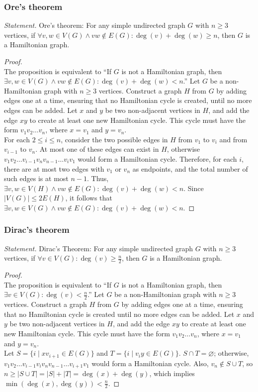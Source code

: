 \documentclass[a4paper,12pt]{report}
\begin{document}
\subsubsection{Ore's theorem}
\textit{Statement. }Ore's theorem: For any simple undirected graph $G$ with $n \geq 3$ vertices, if \(\forall v, w \in V(G) \wedge vw \notin E(G): \deg(v) + \deg(w) \geq n\), then $G$ is a Hamiltonian graph.
\begin{proof}\mbox{}\\
The proposition is equivalent to ``If $G$ is not a Hamiltonian graph, then \(\exists v, w \in V(G) \wedge vw \notin E(G): \deg(v) + \deg(w) < n\).'' Let $G$ be a non-Hamiltonian graph with $n \geq 3$ vertices. Construct a graph $H$ from $G$ by adding edges one at a time, ensuring that no Hamiltonian cycle is created, until no more edges can be added. Let $x$ and $y$ be two non-adjacent vertices in $H$, and add the edge $xy$ to create at least one new Hamiltonian cycle. This cycle must have the form $v_1v_2\ldots v_n$, where $x = v_1$ and $y = v_n$.  \\
For each $2 \leq i \leq n$, consider the two possible edges in $H$ from $v_1$ to $v_i$ and from $v_{i-1}$ to $v_n$. At most one of these edges can exist in $H$, otherwise $v_1v_2\ldots v_{i-1}v_nv_{n-1}\ldots v_iv_1$ would form a Hamiltonian cycle. Therefore, for each $i$, there are at most two edges with $v_1$ or $v_n$ as endpoints, and the total number of such edges is at most $n - 1$. Thus, \(\exists v, w \in V(H) \wedge vw \notin E(G): \deg(v) + \deg(w) < n\). Since $|V(G)| \leq 2E(H)$, it follows that \(\exists v, w \in V(G) \wedge vw \notin E(G): \deg(v) + \deg(w) < n\).
\end{proof}
\subsubsection{Dirac's theorem}
\textit{Statement. }Dirac's Theorem: For any simple undirected graph $G$ with $n \geq 3$ vertices, if $\forall v \in V(G): \deg(v) \geq \frac{n}{2}$, then $G$ is a Hamiltonian graph.
\begin{proof}\mbox{}\\
The proposition is equivalent to ``If $G$ is not a Hamiltonian graph, then $\exists v \in V(G): \deg(v) < \frac{n}{2}$.'' Let $G$ be a non-Hamiltonian graph with $n \geq 3$ vertices. Construct a graph $H$ from $G$ by adding edges one at a time, ensuring that no Hamiltonian cycle is created until no more edges can be added. Let $x$ and $y$ be two non-adjacent vertices in $H$, and add the edge $xy$ to create at least one new Hamiltonian cycle. This cycle must have the form $v_1v_2\ldots v_n$, where $x = v_1$ and $y = v_n$. \\
Let $S = \{i \mid xv_{i+1} \in E(G)\}$ and $T = \{i \mid v_{i}y \in E(G)\}$. $S \cap T = \varnothing$; otherwise, $v_1v_2\ldots v_{i-1}v_iv_nv_{n-1}\ldots v_{i+1}v_1$ would form a Hamiltonian cycle. Also, $v_n \notin S \cup T$, so $n \geq |S \cup T| = |S| + |T| = \deg(x) + \deg(y)$, which implies $\min(\deg(x), \deg(y)) < \frac{n}{2}$.
\end{proof}
\end{document}
